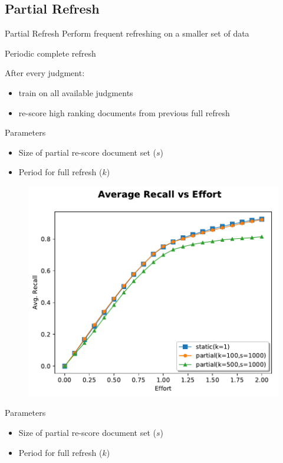 \documentclass{beamer}
\begin{document}
\subsection{Partial Refresh}
\begin{frame}{Partial Refresh}
Perform frequent refreshing on a smaller set of data

Periodic complete refresh

\vskip 1cm
After every judgment:
\begin{itemize}
    \item train on all available judgments
    \item re-score high ranking documents from previous full refresh
\end{itemize}
 
Parameters
\begin{itemize}
    \item Size of partial re-score document set ($s$)
    \item Period for full refresh ($k$)
\end{itemize}

\end{frame}





\begin{frame}
\begin{figure}
 \centering 
 \includegraphics[width=1.0\textwidth]{partial1.pdf}
\end{figure}
Parameters
\begin{itemize}
    \item Size of partial re-score document set ($s$)
    \item Period for full refresh ($k$)
\end{itemize}
\end{frame}
\end{document}

